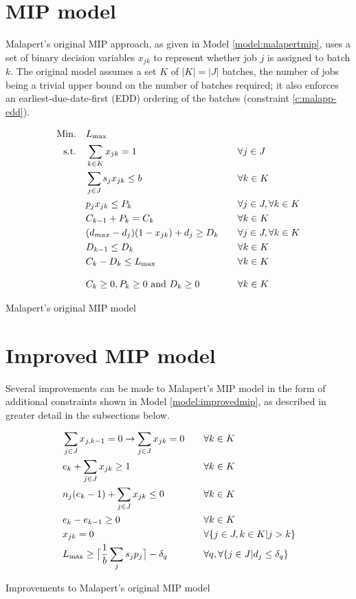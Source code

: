 \section{MIP model}
Malapert's original MIP approach, as given in Model \ref{model:malapertmip},
uses a set of binary decision variables $x_{jk}$ to represent whether job $j$ is
assigned to batch $k$. The original model assumes a set $K$ of $|K| = |J|$
batches, the number of jobs being a trivial upper bound on the number of
batches required; it also enforces an earliest-due-date-first (EDD) ordering of
the batches (constraint \ref{c:malapp-edd}).

\begin{model}[h]
\begin{alignat}{2}
\mathrm{Min.}\quad & L_{\text{max}} && \\
\mathrm{s.t.}\quad &\sum_{k \in K} x_{jk} = 1 \quad && \forall j \in J \\
  &\sum_{j \in J} s_j x_{jk} \leq b \quad && \forall k \in K\\
  &p_j x_{jk} \leq P_k \quad && \forall j \in J, \forall k \in K\\
  &C_{k-1} + P_{k} = C_k \quad && \forall k \in K\\
  &(d_{max} - d_j)(1 - x_{jk}) + d_j \geq D_k \quad && \forall j \in J, \forall k \in K\\
  &D_{k-1} \leq D_k \quad && \forall k \in K \label{c:malapp-edd} \\
  &C_k - D_k \leq L_{\text{max}} \quad && \forall k \in K\\[2ex]
  &C_k \geq 0, P_k \geq 0 \text{ and } D_k \geq 0 \quad && \forall k \in K  
\end{alignat}
\caption{Malapert's original MIP model}
\label{model:malapertmip}
\end{model}

\section{Improved MIP model}
Several improvements can be made to Malapert's MIP model in the form of
additional constraints shown in Model \ref{model:improvedmip}, as  
described in greater detail in the subsections below.

\begin{model}[h]
\begin{alignat}{2}
& \sum_{j \in J} x_{j,k-1} = 0 \rightarrow \sum_{j \in J} x_{jk} = 0 \quad &&
\forall k \in K \\
& e_k + \sum_{j \in J} x_{jk} \geq 1 \quad && \forall k \in K \\
& n_j (e_k-1) + \sum_{j \in J} x_{jk} \leq 0 \quad && \forall k \in K \\
& e_k - e_{k-1} \geq 0 \quad && \forall k \in K \\
& x_{jk} = 0 \quad && \forall \{j \in J, k \in K | j > k \} \\
& L_{\text{max}} \geq \big\lceil\frac{1}{b} \sum_{j} s_j
p_j\big\rceil - \delta_q \quad
&& \forall q, \forall \{ j \in J | d_j \leq \delta_q \}
\end{alignat}
\caption{Improvements to Malapert's original MIP model}
\label{model:improvedmip}
\end{model}

